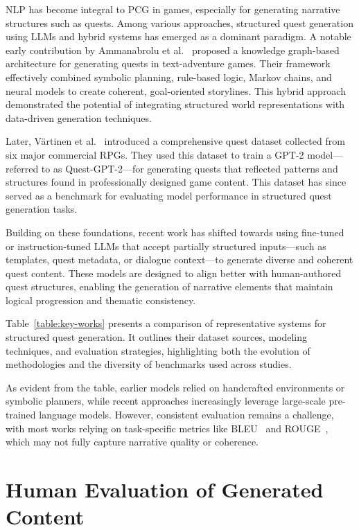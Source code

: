 NLP has become integral to PCG in games, especially for generating narrative structures
such as quests. Among various approaches, structured quest generation using LLMs and
hybrid systems has emerged as a dominant paradigm. A notable early contribution by
Ammanabrolu et al.~\cite{ammanabrolu2019toward} proposed a knowledge graph-based architecture for generating
quests in text-adventure games. Their framework effectively combined symbolic planning,
rule-based logic, Markov chains, and neural models to create coherent, goal-oriented storylines.
This hybrid approach demonstrated the potential of integrating structured world
representations with data-driven generation techniques.

Later, V{\"a}rtinen et al.~\cite{vartinen2022generating} introduced a comprehensive quest dataset collected from
six major commercial RPGs. They used this dataset to train a GPT-2 model—referred
to as Quest-GPT-2—for generating quests that reflected patterns and structures found in
professionally designed game content. This dataset has since served as a benchmark for
evaluating model performance in structured quest generation tasks.

Building on these foundations, recent work has shifted towards using fine-tuned or
instruction-tuned LLMs that accept partially structured inputs—such as templates, quest
metadata, or dialogue context—to generate diverse and coherent quest content. These
models are designed to align better with human-authored quest structures, enabling the
generation of narrative elements that maintain logical progression and thematic consistency.

Table~\ref{table:key-works} presents a comparison of representative systems for structured quest generation.
It outlines their dataset sources, modeling techniques, and evaluation strategies,
highlighting both the evolution of methodologies and the diversity of benchmarks used
across studies.

As evident from the table, earlier models relied on handcrafted environments or symbolic
planners, while recent approaches increasingly leverage large-scale pre-trained language
models. However, consistent evaluation remains a challenge, with most works
relying on task-specific metrics like BLEU~\cite{papineni02bleu} and ROUGE~\cite{lin2004looking}, which may not fully
capture narrative quality or coherence.

\section{Human Evaluation of Generated Content}


